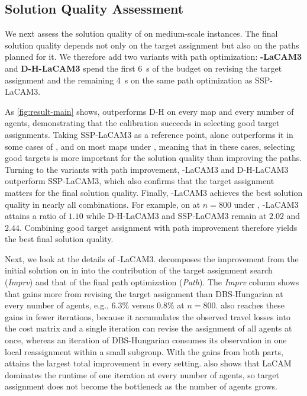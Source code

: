 

\subsection{Solution Quality Assessment}
We next assess the solution quality of \planner on medium-scale instances.
The final solution quality depends not only on the target assignment but also on the paths planned for it.
We therefore add two variants with path optimization: \textbf{\planner-LaCAM3} and \textbf{D-H-LaCAM3} spend the first \SI{6}{\second} of the budget on revising the target assignment and the remaining \SI{4}{\second} on the same path optimization as SSP-LaCAM3.

As \cref{fig:result-main} shows, \planner outperforms D-H on every map and every number of agents, demonstrating that the calibration succeeds in selecting good target assignments.
Taking SSP-LaCAM3 as a reference point, \planner alone outperforms it in some cases of \scenEqdist, and on most maps under \scenHotspot, meaning that in these cases, selecting good targets is more important for the solution quality than improving the paths.
Turning to the variants with path improvement, \planner-LaCAM3 and D-H-LaCAM3 outperform SSP-LaCAM3, which also confirms that the target assignment matters for the final solution quality.
Finally, \planner-LaCAM3 achieves the best solution quality in nearly all combinations.
For example, on  at $n=800$ under \scenEqdist, \planner-LaCAM3 attains a ratio of $1.10$ while D-H-LaCAM3 and SSP-LaCAM3 remain at $2.02$ and $2.44$.
Combining good target assignment with path improvement therefore yields the best final solution quality.


Next, we look at the details of \planner-LaCAM3.
 decomposes the improvement from the initial solution on  in \scenHotspot into the contribution of the target assignment search (\emph{Imprv}) and that of the final path optimization (\emph{Path}).
The \emph{Imprv} column shows that \planner gains more from revising the target assignment than DBS-Hungarian at every number of agents, e.g., $6.3\%$ versus $0.8\%$ at $n=800$.
\planner also reaches these gains in fewer iterations, because it accumulates the observed travel losses into the cost matrix and a single iteration can revise the assignment of all agents at once, whereas an iteration of DBS-Hungarian consumes its observation in one local reassignment within a small subgroup.
With the gains from both parts, \planner attains the largest total improvement in every setting.
 also shows that LaCAM dominates the runtime of one iteration at every number of agents, so target assignment does not become the bottleneck as the number of agents grows.

